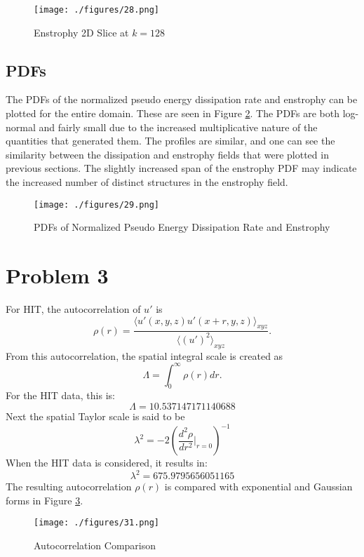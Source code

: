 \documentclass[12pt]{article}
\begin{document}
\begin{figure}
	\centering
	\texttt{[image: ./figures/28.png]}
	\caption{Enstrophy 2D Slice at $k=128$}
	\label{fig:28}
\end{figure}

\subsection{PDFs}
The PDFs of the normalized pseudo energy dissipation rate and enstrophy can be plotted for the entire domain. These are seen in Figure \ref{fig:29}. The PDFs are both log-normal and fairly small due to the increased multiplicative nature of the quantities that generated them. The profiles are similar, and one can see the similarity between the dissipation and enstrophy fields that were plotted in previous sections. The slightly increased span of the enstrophy PDF may indicate the increased number of distinct structures in the enstrophy field. 

\begin{figure}
	\centering
	\texttt{[image: ./figures/29.png]}
	\caption{PDFs of Normalized Pseudo Energy Dissipation Rate and Enstrophy}
	\label{fig:29}
\end{figure}

\section{Problem 3}
For HIT, the autocorrelation of $u'$ is
\[
\rho(r) = \frac{\langle u'(x,y,z)u'(x+r,y,z)\rangle_{xyz}}{\langle(u')^2\rangle_{xyz}}.
\]
From this autocorrelation, the spatial integral scale is created as
\[
\Lambda = \int_0^\infty \rho(r)dr.
\]
For the HIT data, this is:
\[
\Lambda = 10.537147171140688
\]
Next the spatial Taylor scale is said to be
\[
\lambda^2 = -2\left( \frac{d^2\rho}{dr^2}\rvert_{r=0} \right)^{-1}
\]
When the HIT data is considered, it results in:
\[
\lambda^2 = 675.9795656051165
\]
The resulting autocorrelation $\rho(r)$ is compared with exponential and Gaussian forms in Figure \ref{fig:31}.

\begin{figure}[H]
	\centering
	\texttt{[image: ./figures/31.png]}
	\caption{Autocorrelation Comparison}
	\label{fig:31}
\end{figure}




























%
%
\end{document}
